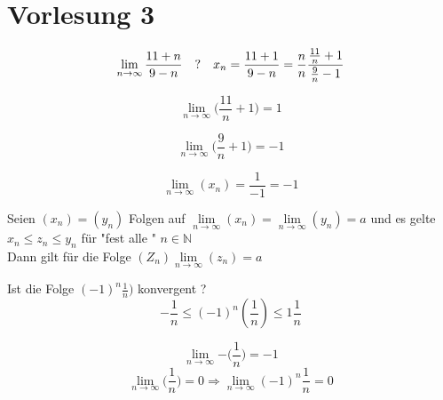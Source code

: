 \section{Vorlesung 3}

\begin{example}
	
\end{example}
\begin{equation}
\lim\limits_{n \rightarrow \infty}{\frac{11+n}{9-n}}\quad ? \\
\\\quad x_n = \frac{11+1}{9-n}=\frac{n}{n} \frac{\frac{11}{n}+1}{\frac{9}{n}-1}
\end{equation}

\begin{equation}
\lim\limits_{n \rightarrow \infty}{\bigg(\frac{11}{n}+1\bigg)}=1
\end{equation}

\begin{equation}
\lim\limits_{n \rightarrow \infty}{\bigg(\frac{9}{n}+1\bigg)}=-1
\end{equation}

\begin{equation}
\lim\limits_{n \rightarrow \infty}{(x_n)}= \frac{1}{-1}=-1
\end{equation}

\begin{lemma}
	Seien $(x_n)=(y_n)$ Folgen auf $\lim\limits_{n \rightarrow \infty}{(x_n)}= \lim\limits_{n \rightarrow \infty}{(y_n)}= a$ und es gelte
	$x_n \leq z_n \leq y_n$ für "fest alle " $n \in \mathbb{N}$\\
	
	Dann gilt für die Folge $(Z_n) \lim\limits_{n \rightarrow \infty}{(z_n)}=a$
\end{lemma}

\begin{example}
	Ist die Folge $(-1)^n\frac{1}{n})$ konvergent ?\\
	
	\[ - \frac{1}{n} \leq(-1)^n(\frac{1}{n}) \leq 1 \frac{1}{n}\]
	
	\[ \lim\limits_{n \rightarrow \infty}{- \big(\frac{1}{n} \big)}= -1 \]
	\[ \lim\limits_{n \rightarrow \infty}{ \big(\frac{1}{n} \big)}= 0 \Rightarrow \lim\limits_{n \rightarrow \infty}{(-1)^n \frac{1}{n}}= 0
	\]
\end{example}

\newpage

